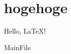 \documentclass[a4paper,11pt]{ltjsarticle}
\begin{document}
\fi

\section{hogehoge}
	Hello, \LaTeX!\cite{Schrodinger1926a}


\ifcsname MainFile\endcsname\else
\end{document}

